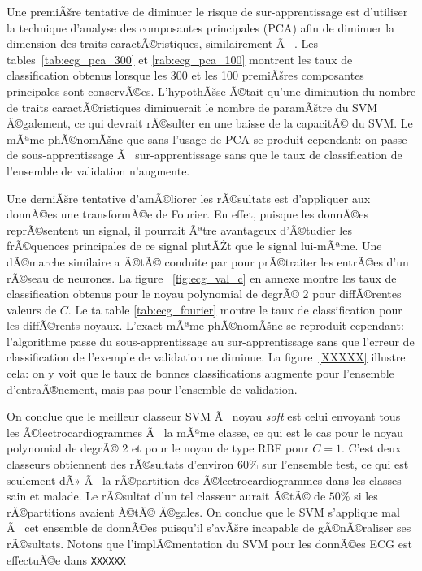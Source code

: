 \documentclass{article}
\begin{document}
Une premiÃšre tentative de diminuer le risque de sur-apprentissage est d'utiliser la technique d'analyse des composantes principales (PCA) afin de diminuer la dimension des traits caractÃ©ristiques, similairement Ã  \cite{polat2007detection}. Les tables~\ref{tab:ecg_pca_300} et \ref{rab:ecg_pca_100} montrent les taux de classification obtenus lorsque les 300 et les 100 premiÃšres composantes principales sont conservÃ©es. L'hypothÃšse Ã©tait qu'une diminution du nombre de traits caractÃ©ristiques diminuerait le nombre de paramÃštre du SVM Ã©galement, ce qui devrait rÃ©sulter en une baisse de la capacitÃ© du SVM. Le mÃªme phÃ©nomÃšne que sans l'usage de PCA se produit cependant: on passe de sous-apprentissage Ã  sur-apprentissage sans que le taux de classification de l'ensemble de validation n'augmente.

Une derniÃšre tentative d'amÃ©liorer les rÃ©sultats est d'appliquer aux donnÃ©es une transformÃ©e de Fourier. En effet, puisque les donnÃ©es reprÃ©sentent un signal, il pourrait Ãªtre avantageux d'Ã©tudier les frÃ©quences principales de ce signal plutÃŽt que le signal lui-mÃªme. Une dÃ©marche similaire a Ã©tÃ© conduite par \cite{gothwal2011cardiac} pour prÃ©traiter les entrÃ©es d'un rÃ©seau de neurones. La figure ~\ref{fig:ecg_val_c} en annexe montre les taux de classification obtenus pour le noyau polynomial de degrÃ© 2 pour diffÃ©rentes valeurs de $C$. Le ta table \ref{tab:ecg_fourier} montre le taux de classification pour les diffÃ©rents noyaux. L'exact mÃªme phÃ©nomÃšne se reproduit cependant: l'algorithme passe du sous-apprentissage au sur-apprentissage sans que l'erreur de classification de l'exemple de validation ne diminue. La figure~\ref{XXXXX} illustre cela: on y voit que le taux de bonnes classifications augmente pour l'ensemble d'entraÃ®nement, mais pas pour l'ensemble de validation.

On conclue que le meilleur classeur SVM Ã  noyau \textit{soft} est celui envoyant tous les Ã©lectrocardiogrammes Ã  la mÃªme classe, ce qui est le cas pour le noyau polynomial de degrÃ© 2 et pour le noyau de type RBF pour $C=1$. C'est deux classeurs obtiennent des rÃ©sultats d'environ $60\%$ sur l'ensemble test, ce qui est seulement dÃ» Ã  la rÃ©partition des Ã©lectrocardiogrammes dans les classes sain et malade. Le rÃ©sultat d'un tel classeur aurait Ã©tÃ© de $50\%$ si les rÃ©partitions avaient Ã©tÃ© Ã©gales. On conclue que le SVM s'applique mal Ã  cet ensemble de donnÃ©es puisqu'il s'avÃšre incapable de gÃ©nÃ©raliser ses rÃ©sultats. Notons que l'implÃ©mentation du SVM pour les donnÃ©es ECG est effectuÃ©e dans \texttt{XXXXXX}
\end{document}
